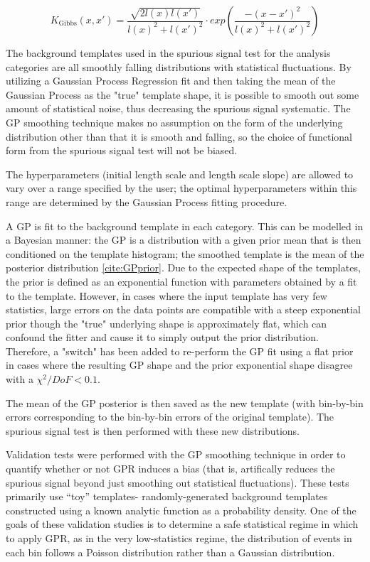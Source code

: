 \begin{equation}
K_\text{Gibbs}(x, x') = \frac{\sqrt{2l(x)l(x')}}{l(x)^2 + l(x')^2 } \cdot exp\left( \frac{-(x-x')^2}{l(x)^2 + l(x')^2} \right)
\end{equation}


The background templates used in the spurious signal test for the analysis categories are all smoothly falling distributions with statistical fluctuations. By utilizing a Gaussian Process Regression fit and then taking the mean of the Gaussian Process as the "true" template shape, it is possible to smooth out some amount of statistical noise, thus decreasing the spurious signal systematic. The GP smoothing technique makes no assumption on the form of the underlying distribution other than that it is smooth and falling, so the choice of functional form from the spurious signal test will not be biased.

The hyperparameters (initial length scale and length scale slope) are allowed to vary over a range specified by the user; the optimal hyperparameters within this range are determined by the Gaussian Process fitting procedure.

A GP is fit to the background template in each category. This can be modelled in a Bayesian manner: the GP is a distribution with a given prior mean that is then conditioned on the template histogram; the smoothed template is the mean of the posterior distribution \ref{cite:GPprior}. Due to the expected shape of the templates, the prior is defined as an exponential function with parameters obtained by a fit to the template. However, in cases where the input template has very few statistics, large errors on the data points are compatible with a steep exponential prior though the "true" underlying shape is approximately flat, which can confound the fitter and cause it to simply output the prior distribution. Therefore, a "switch" has been added to re-perform the GP fit using a flat prior in cases where the resulting GP shape and the prior exponential shape disagree with a $\chi^2/DoF < 0.1$.

The mean of the GP posterior is then saved as the new template (with bin-by-bin errors corresponding to the bin-by-bin errors of the original template). The spurious signal test is then performed with these new distributions.

Validation tests were performed with the GP smoothing technique in order to quantify whether or not GPR induces a bias (that is, artifically reduces the spurious signal beyond just smoothing out statistical fluctuations). These tests primarily use “toy” templates- randomly-generated background templates constructed using a known analytic function as a probability density. One of the goals of these validation studies is to determine a safe statistical regime in which to apply GPR, as in the very low-statistics regime, the distribution of events in each bin follows a Poisson distribution rather than a Gaussian distribution.

